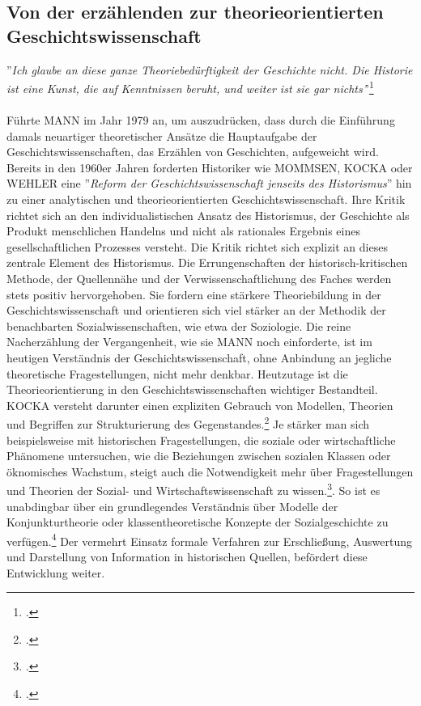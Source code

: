 \documentclass[12pt,a4paper]{article}
\begin{document}
\subsection{Von der erzählenden zur theorieorientierten Geschichtswissenschaft}

''\textit{Ich glaube an diese ganze Theoriebedürftigkeit der Geschichte nicht. Die Historie ist eine Kunst, die auf Kenntnissen beruht, und weiter ist sie gar nichts'}'\footcite[Vgl.][S.53]{mann1979pladoyer}
\\
\\
Führte MANN im Jahr 1979 an, um auszudrücken, dass durch die Einführung damals neuartiger theoretischer Ansätze die Hauptaufgabe der Geschichtswissenschaften, das Erzählen von Geschichten, aufgeweicht wird. Bereits in den 1960er Jahren forderten Historiker wie MOMMSEN, KOCKA oder WEHLER eine ''\textit{Reform der Geschichtswissenschaft jenseits des Historismus}'' hin zu einer analytischen und theorieorientierten Geschichtswissenschaft. Ihre Kritik richtet sich an den individualistischen Ansatz des Historismus, der Geschichte als Produkt menschlichen Handelns und nicht als rationales Ergebnis eines gesellschaftlichen Prozesses versteht. Die Kritik richtet sich explizit an dieses zentrale Element des Historismus. Die Errungenschaften der historisch-kritischen Methode, der Quellennähe und der Verwissenschaftlichung des Faches werden stets positiv hervorgehoben. Sie fordern eine stärkere Theoriebildung in der Geschichtswissenschaft und orientieren sich viel stärker an der Methodik der benachbarten Sozialwissenschaften, wie etwa der Soziologie. Die reine Nacherzählung der Vergangenheit, wie sie MANN noch einforderte, ist im heutigen Verständnis der Geschichtswissenschaft, ohne Anbindung an jegliche theoretische Fragestellungen, nicht mehr denkbar. Heutzutage ist die Theorieorientierung in den Geschichtswissenschaften wichtiger Bestandteil. KOCKA versteht darunter einen expliziten Gebrauch von Modellen, Theorien und Begriffen zur Strukturierung des Gegenstandes.\footcite[][S.2]{magerski2009schreibt}  Je stärker man sich beispielsweise mit historischen Fragestellungen, die soziale oder wirtschaftliche Phänomene untersuchen, wie die Beziehungen zwischen sozialen Klassen oder öknomisches Wachstum, steigt auch die Notwendigkeit mehr über Fragestellungen  und Theorien der Sozial- und Wirtschaftswissenschaft zu wissen.\footcite[][S.6-8]{kocka1982theorien}. So ist es unabdingbar über ein grundlegendes Verständnis über Modelle der Konjunkturtheorie oder klassentheoretische Konzepte der Sozialgeschichte zu verfügen.\footcite[][S.1]{sokollgrundlagen} Der vermehrt Einsatz formale Verfahren zur Erschließung, Auswertung und Darstellung von Information in historischen Quellen, befördert diese Entwicklung weiter.
\end{document}
